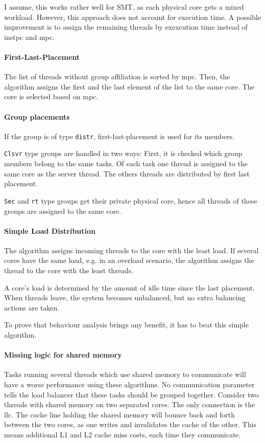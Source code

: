 I assume, this works rather well for SMT, as each physical core gets a mixed
workload.
However, this approach does not account for execution time.
A possible improvement is to assign the remaining threads by
exexcution time instead of \gls{instpc} and \gls{mpc}.


\paragraph{First-Last-Placement}
The list of threads without group affiliation is sorted by \gls{mpc}.
Then, the algorithm assigns the first and the last element of the list to the
same core.
The core is selected based on \gls{mpc}.


\paragraph{Group placements}
If the group is of type \texttt{distr}, first-last-placement is used for its
members.

\texttt{Clsvr} type groups are handled in two ways: First, it is checked which
group members belong to the same tasks.
Of each task one thread is assigned to the same core as the server thread.
The others threads are distributed by first last placement.

\texttt{Sec} and \texttt{rt} type groups get their private physical core, hence
all threads of these groups are assigned to the same core.


\paragraph{Simple Load Distribution}
The algorithm assigns incoming threads to the core with the least load.
If several cores have the same load, e.g. in an overload scenario, the
algorithm assigns the thread to the core with the least threads.

A core's load is determined by the amount of idle time since the last
placement.
When threads leave, the system becomes unbalanced, but no extra balancing
actions are taken.

To prove that behaviour analysis brings any benefit, it has to beat
this simple algorithm.


\paragraph{Missing logic for shared memory}
Tasks running several threads which use shared memory to communicate will have
a worse performance using these algorithms.
No communication parameter tells the load balancer that these tasks should be
grouped together.
Consider two threads with shared memory on two separated cores.
The only connection is the \gls{llc}.
The cache line holding the shared memory will bounce back and forth between
the two cores, as one writes and invalidates the cache of the other.
This means additional L1 and L2 cache miss costs, each time they communicate.

